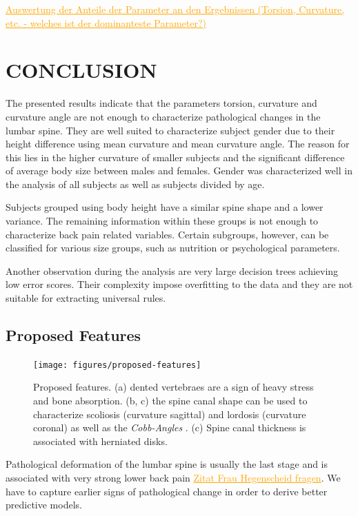 \documentclass[a4paper,twoside]{style/article}
\newcommand{\com}[1]{\textcolor{orange}{\uline{#1}}}
\begin{document}


\com{Auswertung der Anteile der Parameter an den Ergebnissen (Torsion, Curvature, etc. - welches ist der dominanteste Parameter?)}

\section{\uppercase{Conclusion}}
\label{sec:Conclusion}
\noindent The presented results indicate that the parameters torsion, curvature and curvature angle are not enough to characterize pathological changes in the lumbar spine.
They are well suited to characterize subject gender due to their height difference using mean curvature and mean curvature angle.
The reason for this lies in the higher curvature of smaller subjects and the significant difference of average body size between males and females.
Gender was characterized well in the analysis of all subjects as well as subjects divided by age.

Subjects grouped using body height have a similar spine shape and a lower variance.
The remaining information within these groups is not enough to characterize back pain related variables.
Certain subgroups, however, can be classified for various size groups, such as nutrition or psychological parameters.

Another observation during the analysis are very large decision trees achieving low error scores.
Their complexity impose overfitting to the data and they are not suitable for extracting universal rules.
\subsection{Proposed Features}
\label{sec:ProposedFeatures}
\begin{figure}[!h]
  \centering
  \texttt{[image: figures/proposed-features]}
  \caption{
	Proposed features.
	(a) dented vertebraes are a sign of heavy stress and bone absorption.
	(b, c) the spine canal shape can be used to characterize scoliosis (curvature sagittal) and lordosis (curvature coronal) as well as the \emph{Cobb-Angles} \cite{Cobb}.
	(c) Spine canal thickness is associated with herniated disks.
	}
  \label{fig:proposedFeatures}
\end{figure}
\noindent Pathological deformation of the lumbar spine is usually the last stage and is associated with very strong lower back pain \com{Zitat Frau Hegenscheid fragen}.
We have to capture earlier signs of pathological change in order to derive better predictive models.
\end{document}
